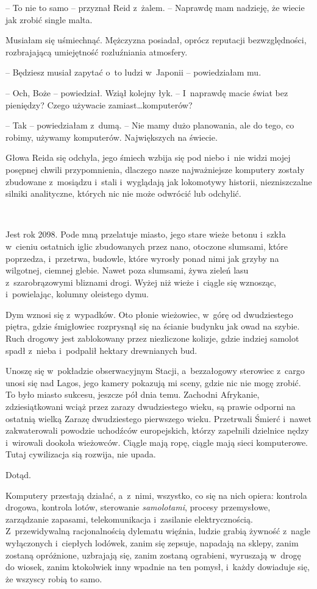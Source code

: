 \documentclass[oneside,polish,11pt,sfheadings]{mwbk}
\begin{document}
-- To nie to samo -- przyznał Reid z~żalem. -- Naprawdę mam nadzieję, że
wiecie jak zrobić single malta.

Musiałam się uśmiechnąć. Mężczyzna posiadał, oprócz reputacji
bezwzględności, rozbrajającą umiejętność rozluźniania atmosfery.

-- Będziesz musiał zapytać o~to ludzi w~Japonii -- powiedziałam mu.

-- Och, Boże -- powiedział. Wziął kolejny łyk. -- I~naprawdę macie świat
bez pieniędzy? Czego używacie zamiast\ldots  komputerów?

-- Tak -- powiedziałam z~dumą. -- Nie mamy dużo planowania, ale do tego, co
robimy, używamy komputerów. Największych na świecie.

Głowa Reida się odchyla, jego śmiech wzbija się pod niebo i~nie widzi
mojej posępnej chwili przypomnienia, dlaczego nasze najważniejsze
komputery zostały zbudowane z~mosiądzu i~stali i~wyglądają jak
lokomotywy historii, niezniszczalne silniki analityczne, których nic nie
może odwrócić lub odchylić.

~

Jest rok 2098. Pode mną przelatuje miasto, jego stare wieże betonu i~szkła w~cieniu ostatnich iglic zbudowanych przez nano, otoczone
slumsami, które poprzedza, i~przetrwa, budowle, które wyrosły ponad nimi
jak grzyby na wilgotnej, ciemnej glebie. Nawet poza slumsami, żywa
zieleń lasu z~szarobrązowymi bliznami drogi. Wyżej niż wieże i~ciągle
się wznosząc, i~powielając, kolumny oleistego dymu.

Dym wznosi się z~wypadków. Oto płonie wieżowiec, w~górę od dwudziestego
piętra, gdzie śmigłowiec rozprysnął się na ścianie budynku jak owad na
szybie. Ruch drogowy jest zablokowany przez niezliczone kolizje, gdzie
indziej samolot spadł z~nieba i~podpalił hektary drewnianych bud.

Unoszę się w~pokładzie obserwacyjnym Stacji, a~bezzałogowy sterowiec z~cargo unosi się nad Lagos, jego kamery pokazują mi sceny, gdzie nic nie
mogę zrobić. To było miasto sukcesu, jeszcze pół dnia temu. Zachodni
Afrykanie, zdziesiątkowani wciąż przez zarazy dwudziestego wieku, są
prawie odporni na ostatnią wielką Zarazę dwudziestego pierwszego wieku.
Przetrwali Śmierć i~nawet zakwaterowali powodzie uchodźców europejskich,
którzy zapełnili dzielnice nędzy i~wirowali dookoła wieżowców. Ciągle
mają ropę, ciągle mają sieci komputerowe. Tutaj cywilizacja sią rozwija,
nie upada.

Dotąd.

Komputery przestają działać, a~z~nimi, wszystko, co się na nich opiera:
kontrola drogowa, kontrola lotów, sterowanie \textit{samolotami}, procesy
przemysłowe, zarządzanie zapasami, telekomunikacja i~zasilanie
elektrycznością. Z~przewidywalną racjonalnością dylematu więźnia, ludzie
grabią żywność z~nagle wyłączonych i~ciepłych lodówek, zanim się
zepsuje, napadają na sklepy, zanim zostaną opróżnione, uzbrajają się,
zanim zostaną ograbieni, wyruszają w~drogę do wiosek, zanim ktokolwiek
inny wpadnie na ten pomysł, i~każdy dowiaduje się, że wszyscy robią to
samo.
\end{document}
